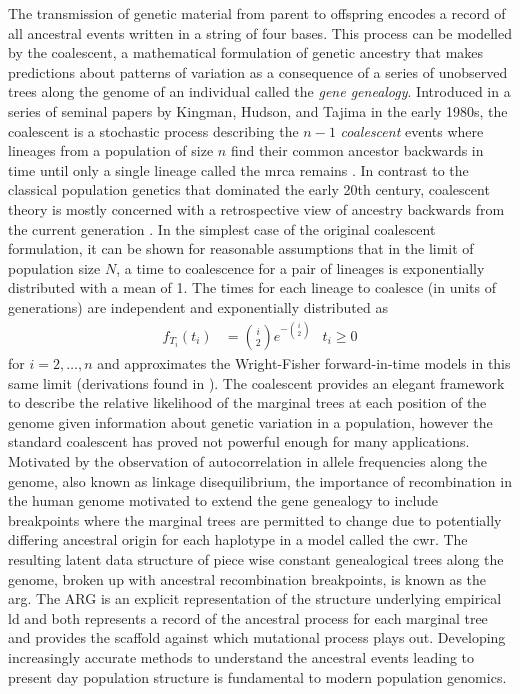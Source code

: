 The transmission of genetic material from parent to offspring encodes a record of all ancestral events written in a string of four bases. This process can be modelled by the coalescent, a mathematical formulation of genetic ancestry that makes predictions about patterns of variation as a consequence of a series of unobserved trees along the genome of an individual called the \textit{gene genealogy}. Introduced in a series of seminal papers by Kingman, Hudson, and Tajima in the early 1980s, the coalescent is a stochastic process describing the $n-1$ \textit{coalescent} events where lineages from a population of size $n$ find their common ancestor backwards in time until only a single lineage called the \gls{mrca} remains \cite{Hudson1983,Kingman1982,Kingman1982a,F1983}. In contrast to the classical population genetics that dominated the early 20th century, coalescent theory is mostly concerned with a retrospective view of ancestry backwards from the current generation \cite{Ewens1990}. In the simplest case of the original coalescent formulation, it can be shown for reasonable assumptions that in the limit of population size $N$, a time to coalescence for a pair of lineages is exponentially distributed with a mean of 1. The times for each lineage to coalesce (in units of generations) are independent and exponentially distributed as $$ \begin{aligned} f_{T_i} (t_i) &=  \binom{i}{2}  e^{- \binom{i}{2}}  &t_i \geq 0 \end{aligned}$$ for $i = 2, \ldots, n$ and approximates the Wright-Fisher forward-in-time models in this same limit (derivations found in \textcite[Chapter 3.2]{Wakeley2009a}). The coalescent provides an elegant framework to describe the relative likelihood of the marginal trees at each position of the genome given information about genetic variation in a population, however the standard coalescent has proved not powerful enough for many applications. Motivated by the observation of autocorrelation in allele frequencies along the genome, also known as linkage disequilibrium, the importance of recombination in the human genome motivated \textcite{Griffiths1997a} to extend the gene genealogy to include breakpoints where the marginal trees are permitted to change due to potentially differing ancestral origin for each haplotype in a model called the \gls{cwr}. The resulting latent data structure of piece wise constant genealogical trees along the genome, broken up with ancestral recombination breakpoints, is known as the \gls{arg}. The ARG is an explicit representation of the structure underlying empirical \gls{ld} and both represents a record of the ancestral process for each marginal tree and provides the scaffold against which mutational process plays out. Developing increasingly accurate methods to understand the ancestral events leading to present day population structure is fundamental to modern population genomics.  

